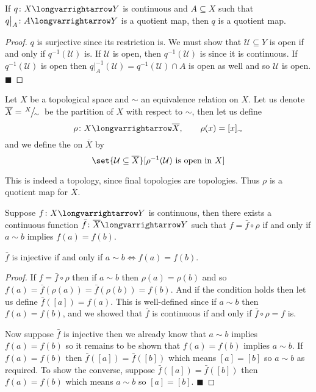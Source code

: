 \documentclass[10pt]{article}
\def\qed{\hskip1cm\penalty-100\hbox{}\hfill$\blacksquare$}
\def\mU{\mathcal{U}}
\def\longto{\longvarrightarrow}
\begin{document}
\begin{prop*}

    If $q\colon X\longto Y$ is continuous and $A\subseteq X$ such that $q\bigl|_A\colon A\longto Y$ is a quotient map, then $q$ is a quotient map.

\end{prop*}

\begin{proof}

    $q$ is surjective since its restriction is.
    We must show that $\mU\subseteq Y$ is open if and only if $q^{-1}(\mU)$ is.
    If $\mU$ is open, then $q^{-1}(\mU)$ is since it is continuous.
    If $q^{-1}(\mU)$ is open then $q\bigl|_A^{-1}(\mU)=q^{-1}(\mU)\cap A$ is open as well and so $\mU$ is open.
    \qed

\end{proof}

\begin{defn*}

    Let $X$ be a topological space and $\sim$ an equivalence relation on $X$.
    Let us denote $\overline X=\slfrac X\sim$ be the partition of $X$ with respect to $\sim$, then let us define
    \[ \rho\colon X\longto\overline X,\qquad \rho(x)=[x]_\sim \]
    and we define the  on $\overline X$ by
    \[ \set{\mU\subseteq\overline X}[\rho^{-1}(\mU)\text{ is open in }X] \]

\end{defn*}

This is indeed a topology, since final topologies are topologies.
Thus $\rho$ is a quotient map for $\overline X$.

\begin{prop*}

    Suppose $f\colon X\longto Y$ is continuous, then there exists a continuous function $\bar f\colon\overline X\longto Y$ such that $f=\bar f\circ\rho$ if and only if $a\sim b$ implies $f(a)=f(b)$.

    $\bar f$ is injective if and only if $a\sim b\iff f(a)=f(b)$.

\end{prop*}

\begin{proof}

    If $f=\bar f\circ\rho$ then if $a\sim b$ then $\rho(a)=\rho(b)$ and so $f(a)=\bar f(\rho(a))=\bar f(\rho(b))=f(b)$.
    And if the condition holds then let us define $\bar f([a])=f(a)$.
    This is well-defined since if $a\sim b$ then $f(a)=f(b)$, and we showed that $\bar f$ is continuous if and only if $\bar f\circ\rho=f$ is.

    Now suppose $\bar f$ is injective then we already know that $a\sim b$ implies $f(a)=f(b)$ so it remains to be shown that $f(a)=f(b)$ implies $a\sim b$.
    If $f(a)=f(b)$ then $\bar f([a])=\bar f([b])$ which means $[a]=[b]$ so $a\sim b$ as required.
    To show the converse, suppose $\bar f([a])=\bar f([b])$ then $f(a)=f(b)$ which means $a\sim b$ so $[a]=[b]$.
    \qed

\end{proof}
\end{document}
